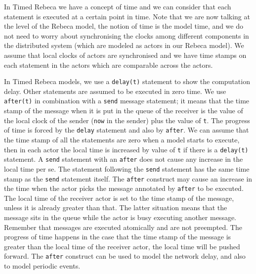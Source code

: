 In Timed Rebeca we have a concept of time and we can consider that each statement is executed at a certain point in time. Note that we are now talking at the level of the Rebeca model, the notion of time is the model time, and we do not need to worry about synchronising the clocks among different components in the distributed system (which are modeled as actors in our Rebeca model). We assume that local clocks of actors are synchronised and we  have time stamps on each statement  in the actors which are comparable across the actors.

In Timed Rebeca models, we use a \texttt{delay(t)} statement to show the computation delay. Other statements are assumed to be executed in zero time. We use  \texttt{after(t)} in combination with a \texttt{send} message statement; it means that the time stamp of the message when it is put in the queue of the receiver is the value of the local clock of the sender (\texttt{now} in the sender) plus the value of \texttt{t}.
The progress of time is forced by the \texttt{delay} statement and also by \texttt{after}. 
We can assume that the time stamp of all the statements are zero when a model starts to execute, then in each actor the local time is increased by value of \texttt{t} if there is a \texttt{delay(t)} statement.
A \texttt{send} statement with an  \texttt{after} does not cause any increase in the local time per se. The statement following the \texttt{send} statement has the same time stamp as the \texttt{send} statement itself.
The \texttt{after} construct may cause an increase in the time when the actor picks the message annotated by \texttt{after} to be executed. The local time of the receiver actor is set to the time stamp of the message, unless it is already greater than that.
The latter situation means that the message  sits in the queue while the actor is busy executing another message.
Remember that messages are executed atomically and are not preempted.
%
The progress of time happens in the case that the time stamp of the message is greater than the local time of the receiver actor, the local time will be pushed forward.
%
The \texttt{after} construct can be used to model the network delay, and also to model periodic events.


